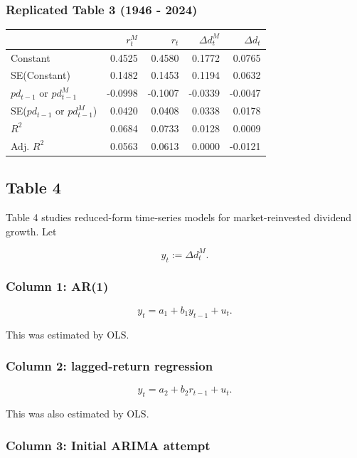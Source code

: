 \documentclass[11pt]{article}
\begin{document}
\subsubsection{Replicated Table 3 (1946 -
2024)}\label{replicated-table-3-1946---2024}

{\def\LTcaptype{none} %
\begin{longtable}[]{@{}lrrrr@{}}
\toprule\noalign{}
& \(r_t^M\) & \(r_t\) & \(\Delta d_t^M\) & \(\Delta d_t\) \\
\midrule\noalign{}
\endhead
\bottomrule\noalign{}
\endlastfoot
Constant & 0.4525 & 0.4580 & 0.1772 & 0.0765 \\
SE(Constant) & 0.1482 & 0.1453 & 0.1194 & 0.0632 \\
\(pd_{t-1}\) or \(pd_{t-1}^M\) & -0.0998 & -0.1007 & -0.0339 &
-0.0047 \\
SE(\(pd_{t-1}\) or \(pd_{t-1}^M\)) & 0.0420 & 0.0408 & 0.0338 &
0.0178 \\
\(R^2\) & 0.0684 & 0.0733 & 0.0128 & 0.0009 \\
Adj. \(R^2\) & 0.0563 & 0.0613 & 0.0000 & -0.0121 \\
\end{longtable}
}

    \subsection{Table 4}\label{table-4}

Table 4 studies reduced-form time-series models for market-reinvested
dividend growth. Let

\[
y_t := \Delta d_t^M.
\]

\subsubsection{Column 1: AR(1)}\label{column-1-ar1}

\[
y_t = a_1 + b_1 y_{t-1} + u_t.
\]

This was estimated by OLS.

\subsubsection{Column 2: lagged-return
regression}\label{column-2-lagged-return-regression}

\[
y_t = a_2 + b_2 r_{t-1} + u_t.
\]

This was also estimated by OLS.

\subsubsection{Column 3: Initial ARIMA
attempt}\label{column-3-initial-arima-attempt}
\end{document}
